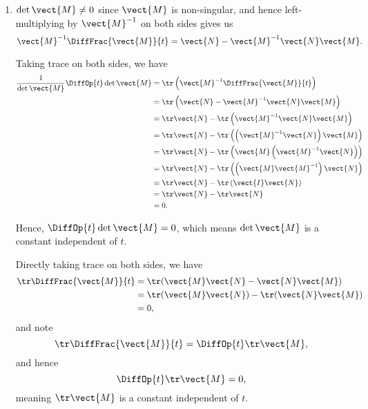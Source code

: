 \begin{enumerate}
    \item \(\det \vect{M} \neq 0\) since \(\vect{M}\) is non-singular, and hence left-multiplying by \(\vect{M}^{-1}\) on both sides gives us
          \[
              \vect{M}^{-1} \DiffFrac{\vect{M}}{t} = \vect{N} - \vect{M}^{-1} \vect{N} \vect{M}.
          \]

          Taking trace on both sides, we have
          \begin{align*}
              \frac{1}{\det \vect{M}} \DiffOp{t} \det \vect{M} & = \tr \left(\vect{M}^{-1} \DiffFrac{\vect{M}}{t}\right)                        \\
                                                               & = \tr \left(\vect{N} - \vect{M}^{-1} \vect{N} \vect{M}\right)                  \\
                                                               & = \tr \vect{N} - \tr \left(\vect{M}^{-1} \vect{N} \vect{M}\right)              \\
                                                               & = \tr \vect{N} - \tr \left(\left(\vect{M}^{-1} \vect{N}\right) \vect{M}\right) \\
                                                               & = \tr \vect{N} - \tr \left(\vect{M} \left(\vect{M}^{-1} \vect{N}\right)\right) \\
                                                               & = \tr \vect{N} - \tr \left(\left(\vect{M} \vect{M}^{-1}\right) \vect{N}\right) \\
                                                               & = \tr \vect{N} - \tr \left(\vect{I} \vect{N}\right)                            \\
                                                               & = \tr \vect{N} - \tr \vect{N}                                                  \\
                                                               & = 0.
          \end{align*}

          Hence, \(\DiffOp{t} \det \vect{M} = 0\), which means \(\det \vect{M}\) is a constant independent of \(t\).

          Directly taking trace on both sides, we have
          \begin{align*}
              \tr \DiffFrac{\vect{M}}{t} & = \tr (\vect{M} \vect{N} - \vect{N} \vect{M})       \\
                                         & = \tr (\vect{M} \vect{N}) - \tr (\vect{N} \vect{M}) \\
                                         & = 0,
          \end{align*}
          and note
          \[
              \tr \DiffFrac{\vect{M}}{t} = \DiffOp{t} \tr \vect{M},
          \]
          and hence
          \[
              \DiffOp{t} \tr \vect{M} = 0,
          \]
          meaning \(\tr \vect{M}\) is a constant independent of \(t\).


\end{enumerate}
